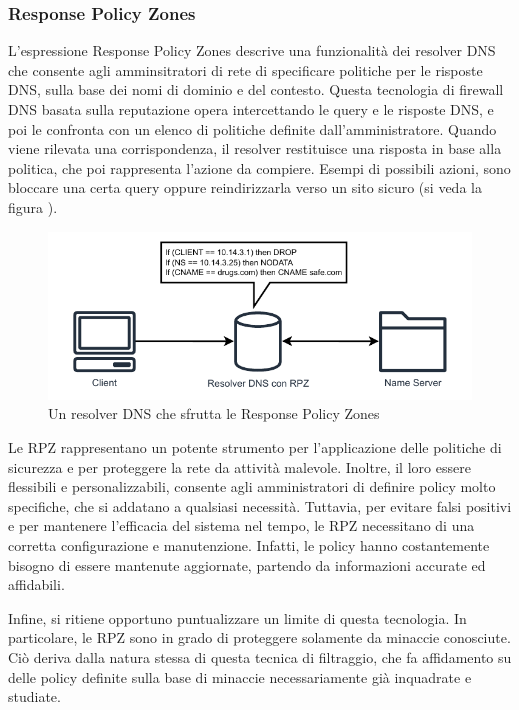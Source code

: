 \subsubsection{Response Policy Zones}
L'espressione Response Policy Zones descrive una funzionalità dei resolver DNS che consente agli amminsitratori di rete di specificare politiche per le risposte DNS, sulla base dei nomi di dominio e del contesto. Questa tecnologia di firewall DNS basata sulla reputazione opera intercettando le query e le risposte DNS, e poi le confronta con un elenco di politiche definite dall'amministratore. Quando viene rilevata una corrispondenza, il resolver restituisce una risposta in base alla politica, che poi rappresenta l'azione da compiere. Esempi di possibili azioni, sono bloccare una certa query oppure reindirizzarla verso un sito sicuro (si veda la figura ).

\begin{figure}
  \centering
  \includegraphics[width=1.0\linewidth]{figures/Response_Policy_zones.pdf}
  \caption{Un resolver DNS che sfrutta le Response Policy Zones}
  \label{fig:rpz}
\end{figure}

Le RPZ rappresentano un potente strumento per l'applicazione delle politiche di sicurezza e per proteggere la rete da attività malevole. Inoltre, il loro essere flessibili e personalizzabili, consente agli amministratori di definire policy molto specifiche, che si addatano a qualsiasi necessità. Tuttavia, per evitare falsi positivi e per mantenere l'efficacia del sistema nel tempo, le RPZ necessitano di una corretta configurazione e manutenzione. Infatti, le policy hanno costantemente bisogno di essere mantenute aggiornate, partendo da informazioni accurate ed affidabili.

Infine, si ritiene opportuno puntualizzare un limite di questa tecnologia. In particolare, le RPZ sono in grado di proteggere solamente da minaccie conosciute. Ciò deriva dalla natura stessa di questa tecnica di filtraggio, che fa affidamento su delle policy definite sulla base di minaccie necessariamente già inquadrate e studiate.

